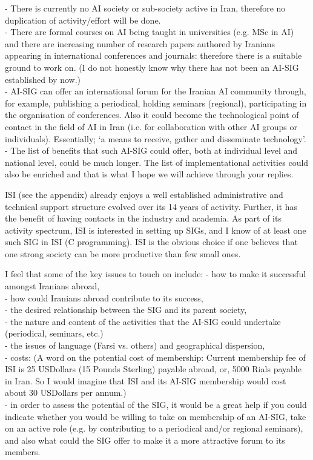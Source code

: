 - There is currently no AI society or sub-society active in Iran, therefore 
  no duplication of activity/effort will be done.\\
- There are formal courses on AI being taught in universities (e.g. MSc in AI)
  and there are increasing number of research papers authored by Iranians 
  appearing in international conferences and journals: therefore there is a 
  suitable ground to work on. (I do not honestly know why there has not been 
  an AI-SIG established by now.)\\
- AI-SIG can offer an international  forum for the Iranian AI community 
  through, for example, publishing a periodical, holding seminars (regional), 
  participating in the organisation of conferences. Also it could become the 
  technological point of contact in the field of AI in Iran (i.e. for 
  collaboration with other AI groups or individuals). Essentially; `a means 
  to receive, gather and disseminate technology'.\\
- The list of benefits that such AI-SIG could offer, both at individual 
  level and national level, could be much longer. The list of implementational 
  activities could also be enriched and that is what I hope we will achieve 
  through your replies.

ISI (see the appendix) already enjoys a well established administrative and 
technical support structure evolved over its 14 years of activity. Further, 
it has the benefit of having contacts in the industry and academia. As part 
of its activity spectrum, ISI is interested in setting up SIGs, and I know 
of at least one such SIG in ISI (C programming). ISI  is the obvious choice 
if one believes that one strong society can be more productive than few 
small ones.

I feel that some of the key issues to touch on include:
- how to make it successful amongst Iranians abroad, \\
- how could Iranians abroad contribute to its success,\\
- the desired relationship between the SIG and its parent society,\\
- the nature and content of the activities that the AI-SIG could undertake 
  (periodical, seminars, etc.)\\
- the issues of language (Farsi vs. others) and geographical dispersion,\\
- costs: (A word on the potential cost of membership:  Current membership fee
 of ISI is 25 USDollars (15 Pounds Sterling) payable abroad, or, 5000 Rials 
 payable in Iran. So I would imagine that ISI and its AI-SIG membership would
  cost about 30 USDollars per annum.)\\
- in order to assess the potential of the SIG, it would be a great help if you
  could indicate whether you would be willing to take on membership of an 
  AI-SIG, take on an active role (e.g. by contributing to a periodical and/or
  regional seminars), and also what could the SIG offer to make it a more 
  attractive forum to its members.

